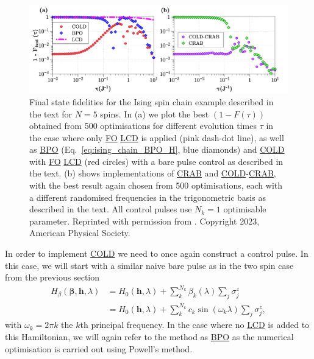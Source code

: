 \documentclass[a4paper,oneside,11pt]{book}
\newcommand{\betabb}{\boldsymbol{\beta}}
\newcommand{\hbb}{\boldsymbol{h}}
\newcommand{\sz}{\sigma^z}
\newcommand{\acrref}[1]{\hyperref[acr:#1]{#1}}
\begin{document}
\begin{figure}[t]
    \centering
    \includegraphics[width=\linewidth]{images/IsingUnconstrained.jpg} \caption[Applying COLD and COLD-CRAB to the Ising chain for 5 spins without constraints on the driving amplitudes.]{Final state fidelities for the Ising spin chain example described in the text for $N=5$ spins. In (a) we plot the best $(1 - F(\tau))$ obtained from 500 optimisations for different evolution times $\tau$ in the case where only \acrref{FO} \acrref{LCD} is applied (pink dash-dot line), as well as \acrref{BPO} (Eq.~\eqref{eq:ising_chain_BPO_H}, blue diamonds) and \acrref{COLD} with \acrref{FO} \acrref{LCD} (red circles) with a bare pulse control as described in the text. (b) shows implementations of \acrref{CRAB} and \acrref{COLD}-\acrref{CRAB}, with the best result again chosen from 500 optimisations, each with a different randomised frequencies in the trigonometric basis as described in the text. All control pulses use $N_k = 1$ optimisable parameter. Reprinted with permission from \cite{cepaite_counterdiabatic_2023}. Copyright 2023, American Physical Society.} \label{fig:ising_unconstrained}
\end{figure}

In order to implement \acrref{COLD} we need to once again construct a control pulse. In this case, we will start with a similar naive bare pulse as in the two spin case from the previous section
\begin{equation}\label{eq:ising_chain_BPO_H}
    \begin{aligned}
        H_{\beta}(\betabb, \hbb, \lambda) &= H_0(\hbb, \lambda) + \sum_k^{N_k} \beta_k(\lambda) \sum_j \sz_j \\
        &= H_0(\hbb, \lambda) + \sum_k^{N_k} c_k \sin(\omega_k \lambda) \sum_j \sz_j,
    \end{aligned}
\end{equation}
with $\omega_k = 2\pi k$ the $k$th principal frequency. In the case where no \acrref{LCD} is added to this Hamiltonian, we will again refer to the method as \acrref{BPO} as the numerical optimisation is carried out using Powell's method.
\end{document}
